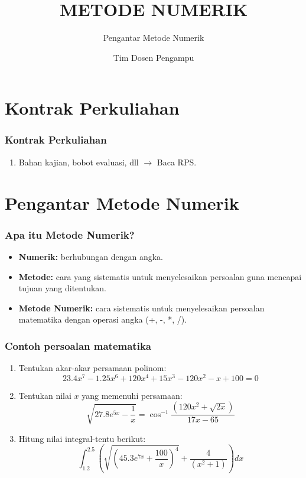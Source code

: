 \documentclass[pdflatex,compress]{beamer}
\title{METODE NUMERIK}
\subtitle{Pengantar Metode Numerik}
\author{Tim Dosen Pengampu}
\begin{document}
\maketitle

\section{Kontrak Perkuliahan}

\begin{frame}
\frametitle{Kontrak Perkuliahan}
	\begin{enumerate}
		\item Bahan kajian, bobot evaluasi, dll $\rightarrow$ Baca RPS.
	\end{enumerate}
\end{frame}

\section{Pengantar Metode Numerik}

\begin{frame}
\frametitle{Apa itu Metode Numerik?}
	\begin{itemize}
		\item \textbf{Numerik:} berhubungan dengan angka.
		\item \textbf{Metode:} cara yang sistematis untuk menyelesaikan persoalan guna mencapai tujuan yang ditentukan.
		\item \textbf{Metode Numerik:} cara sistematis untuk menyelesaikan persoalan matematika dengan operasi angka (+, -, *, /).
	\end{itemize}
\end{frame}

\begin{frame}
\frametitle{Contoh persoalan matematika}
	\begin{enumerate}
		\item Tentukan akar-akar persamaan polinom:
		\[ 23.4x^7 - 1.25x^6 + 120x^4 + 15x^3 - 120x^2- x + 100 = 0
		 \]
		 \item Tentukan nilai $ x $ yang memenuhi persamaan:
		 \[ \sqrt{27.8e^{5x} - \frac{1}{x}} = \cos^{-1}\frac{(120x^2 + \sqrt{2x})}{17x-65}\]
		 \item Hitung nilai integral-tentu berikut:
		 \[ \int_{1.2}^{2.5} \left( \sqrt{\left(45.3e^{7x}+\frac{100}{x}\right)^4} + \frac{4}{(x^2 + 1)} \right) dx \]
	\end{enumerate}
\end{frame}
\end{document}
